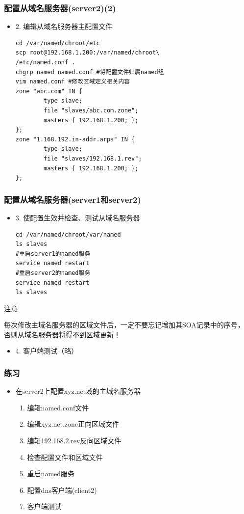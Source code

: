 \documentclass[xcolor=svgnames,presentation]{beamer}
\begin{document}
\begin{frame}[fragile]
\frametitle{配置从域名服务器(server2)(2)}
\label{sec-1-13}
\begin{itemize}

\item 2. 编辑从域名服务器主配置文件\\
\label{sec-1-13-1}%
\begin{verbatim}
cd /var/named/chroot/etc
scp root@192.168.1.200:/var/named/chroot\
/etc/named.conf .
chgrp named named.conf #将配置文件归属named组
vim named.conf #修改区域定义相关内容
zone "abc.com" IN {
        type slave;
        file "slaves/abc.com.zone";
        masters { 192.168.1.200; };
};
zone "1.168.192.in-addr.arpa" IN {
        type slave;
        file "slaves/192.168.1.rev";
        masters { 192.168.1.200; };
};
\end{verbatim}
\end{itemize} %
\end{frame}
\begin{frame}[fragile]
\frametitle{配置从域名服务器(server1和server2)}
\label{sec-1-14}
\begin{itemize}

\item 3. 使配置生效并检查、测试从域名服务器\\
\label{sec-1-14-1}%
\begin{verbatim}
cd /var/named/chroot/var/named
ls slaves
#重启server1的named服务
service named restart
#重启server2的named服务
service named restart
ls slaves
\end{verbatim}
\end{itemize} %
\begin{block}{注意}
\label{sec-1-14-2}

每次修改主域名服务器的区域文件后，一定不要忘记增加其SOA记录中的序号，否则从域名服务器将得不到区域更新！
\end{block}
\begin{itemize}

\item 4. 客户端测试（略）
\label{sec-1-14-3}%
\end{itemize} %
\end{frame}
\begin{frame}
\frametitle{练习}
\label{sec-1-15}
\begin{itemize}

\item 在server2上配置xyz.net域的主域名服务器
\label{sec-1-15-1}%
\begin{enumerate}
\item 编辑named.conf文件
\item 编辑xyz.net.zone正向区域文件
\item 编辑192.168.2.rev反向区域文件
\item 检查配置文件和区域文件
\item 重启named服务
\item 配置dns客户端(client2)
\item 客户端测试
\end{enumerate}
\end{itemize} %
\end{frame}
\end{document}

